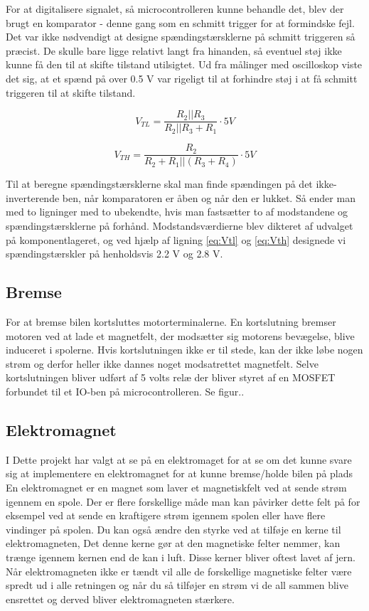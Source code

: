 For at digitalisere signalet, så microcontrolleren kunne behandle det, blev der brugt en komparator - denne gang som en schmitt trigger for at formindske fejl. Det var ikke nødvendigt at designe spændingstærsklerne på schmitt triggeren så præcist. De skulle bare ligge relativt langt fra hinanden, så eventuel støj ikke kunne få den til at skifte tilstand utilsigtet. Ud fra  målinger med oscilloskop viste det sig, at et spænd på over 0.5 V var rigeligt til at forhindre støj i at få schmitt triggeren til at skifte tilstand.

\begin{equation}
V_{TL} = \dfrac{R_{2}||R_{3}}{R_{2}||R_{3}+R_{1}} \cdot 5V
\label{eq:Vtl}
\end{equation}


\begin{equation}
V_{TH} = \dfrac{R_{2}}{R_{2}+R_{1}||(R_{3}+R_{4})} \cdot 5V
\label{eq:Vth}
\end{equation}



Til at beregne spændingstærsklerne skal man finde spændingen på det ikke-inverterende ben, når komparatoren er åben og når den er lukket. Så ender man med to ligninger med to ubekendte, hvis man fastsætter to af modstandene og spændingstærsklerne på forhånd. Modstandsværdierne blev dikteret af udvalget på komponentlageret, og ved hjælp af ligning \eqref{eq:Vtl} og \eqref{eq:Vth} designede vi spændingstærskler på henholdsvis 2.2 V og 2.8 V. 

\subsection{Bremse}

For at bremse bilen kortsluttes motorterminalerne. En kortslutning bremser motoren ved at lade et magnetfelt, der modsætter sig motorens bevægelse, blive induceret i spolerne. Hvis kortslutningen ikke er til stede, kan der ikke løbe nogen strøm og derfor heller ikke dannes noget modsatrettet magnetfelt. Selve kortslutningen bliver udført af 5 volts relæ der bliver styret af en MOSFET forbundet til et IO-ben på microcontrolleren. Se figur.. 

\subsection{Elektromagnet}
I Dette projekt har valgt at se på en elektromaget for at se om det kunne svare sig at implementere en elektromagnet for at kunne bremse/holde bilen på plads
En elektromagnet er en magnet som laver et magnetiskfelt ved at sende strøm igennem en spole. Der er flere forskellige måde man kan påvirker dette felt på for eksempel ved at sende en kraftigere strøm igennem spolen eller have flere vindinger på spolen. Du kan også ændre den styrke ved at tilføje en kerne til elektromagneten, Det denne kerne gør at den magnetiske felter nemmer, kan trænge igennem kernen end de kan i luft. Disse kerner bliver oftest lavet af jern.
Når elektromagneten ikke er tændt vil alle de forskellige magnetiske felter være spredt ud i alle retningen og når du så tilføjer en strøm vi de all sammen blive ensrettet og derved bliver elektromagneten stærkere.

